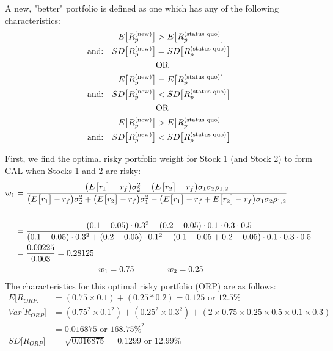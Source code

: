 \documentclass[12pt]{article}
\begin{document}
A new, "better" portfolio is defined as one which has any of the following characteristics:
\begin{align*}
	E\big[R_p^{\text{(new)}}\big] &> E\big[R_p^{\text{(status quo)}}\big]\\
	\text{and:\quad}SD\big[R_p^{\text{(new)}}\big] &= SD\big[R_p^{\text{(status quo)}}\big]\\
	&\text{OR}\\
	E\big[R_p^{\text{(new)}}\big] &= E\big[R_p^{\text{(status quo)}}\big]\\
	\text{and:\quad}SD\big[R_p^{\text{(new)}}\big] &< SD\big[R_p^{\text{(status quo)}}\big]\\
	&\text{OR}\\
	E\big[R_p^{\text{(new)}}\big] &> E\big[R_p^{\text{(status quo)}}\big]\\
	\text{and:\quad}SD\big[R_p^{\text{(new)}}\big] &< SD\big[R_p^{\text{(status quo)}}\big]\\
\end{align*}

\newpage
First, we find the optimal risky portfolio weight for Stock 1 (and Stock 2) to form CAL when Stocks 1 and 2 are risky:
\begin{align*}
	w_1 &= \frac{\big(E\big[r_1\big]-r_f\big)\sigma_2^2-\big(E\big[r_2\big]-r_f\big)\sigma_1\sigma_2\rho_{1,2}}{\big(E\big[r_1\big]-r_f\big)\sigma_2^2 + \big(E\big[r_2\big]-r_f\big)\sigma_1^2-\big(E\big[r_1\big]-r_f+E\big[r_2\big]-r_f\big)\sigma_1\sigma_2\rho_{1,2}}\\
	&\\
	&= \frac{(0.1-0.05)\cdot0.3^2-(0.2-0.05)\cdot0.1\cdot0.3\cdot0.5}{(0.1-0.05)\cdot0.3^2+(0.2-0.05)\cdot0.1^2-(0.1-0.05+0.2-0.05)\cdot0.1\cdot0.3\cdot0.5}\\
	&= \frac{0.00225}{0.003} = 0.28125\\
	&\text{\qquad\qquad\qquad\qquad\qquad} w_1 = 0.75 \text{\qquad\qquad} w_2 = 0.25\\
\end{align*}
The characteristics for this optimal risky portfolio (ORP) are as follows:
\begin{align*}
	E\big[R_{ORP}\big] &= (0.75\times0.1) + (0.25*0.2) = 0.125 \text{ or } 12.5\%\\
	Var\big[R_{ORP}\big] &= (0.75^2\times0.1^2)+(0.25^2\times0.3^2) + (2\times0.75\times0.25\times0.5\times0.1\times0.3)\\
	&= 0.016875 \text{ or } 168.75\%^2\\
	SD\big[R_{ORP}\big] &= \sqrt{0.016875} = 0.1299 \text { or } 12.99\%\\
\end{align*}
\end{document}
